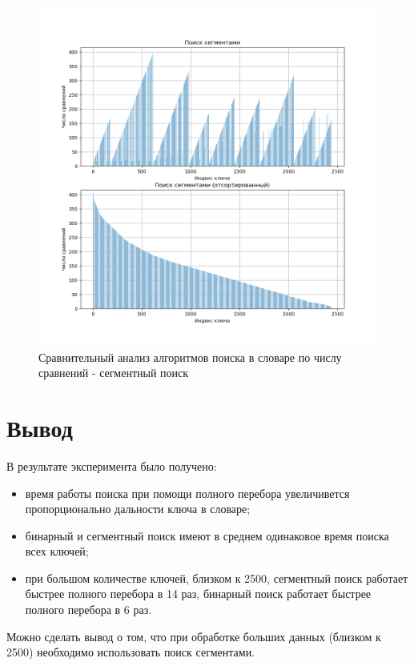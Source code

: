 \begin{figure}[H]
	\begin{center}
		\includegraphics[scale=0.5]{img/segment_cmprs.png}
	\end{center}
	\captionsetup{justification=centering}
	\caption{Сравнительный анализ алгоритмов поиска в словаре по числу сравнений - сегментный поиск}
	\label{img:segment-cmprs}
\end{figure}

\section{Вывод}

В результате эксперимента было получено:
\begin{itemize}
	\item время работы поиска при помощи полного перебора увеличивется пропорционально дальности ключа в словаре;
	\item бинарный и сегментный поиск имеют в среднем одинаковое время поиска всех ключей;
	\item при большом количестве ключей, близком к 2500, сегментный поиск работает быстрее полного перебора в 14 раз, бинарный поиск работает быстрее полного перебора в 6 раз.
\end{itemize}

Можно сделать вывод о том, что при обработке больших данных (близком к 2500) необходимо использовать поиск сегментами.


